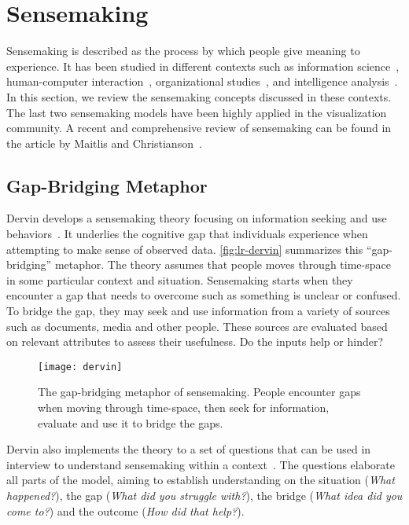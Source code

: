 \section{Sensemaking}
Sensemaking is described as the process by which people give meaning to experience. It has been studied in different contexts such as information science~\cite{Dervin1983}, human-computer interaction~\cite{Russell1993}, organizational studies~\cite{Weick1995}, and intelligence analysis~\cite{Pirolli2005,Klein2003}. In this section, we review the sensemaking concepts discussed in these contexts. The last two sensemaking models have been highly applied in the visualization community. A recent and comprehensive review of sensemaking can be found in the article by Maitlis and Christianson~\cite{Maitlis2014}.

\subsection{Gap-Bridging Metaphor}
Dervin develops a sensemaking theory focusing on information seeking and use behaviors~\cite{Dervin1983}. It underlies the cognitive gap that individuals experience when attempting to make sense of observed data. \autoref{fig:lr-dervin} summarizes this ``gap-bridging'' metaphor. The theory assumes that people moves through time-space in some particular context and situation. Sensemaking starts when they encounter a gap that needs to overcome such as something is unclear or confused. To bridge the gap, they may seek and use information from a variety of sources such as documents, media and other people. These sources are evaluated based on relevant attributes to assess their usefulness. Do the inputs help or hinder?

\begin{figure}[!htb]
	\centering
	\texttt{[image: dervin]}
	\caption{The gap-bridging metaphor of sensemaking. People encounter gaps when moving through time-space, then seek for information, evaluate and use it to bridge the gaps. }
	\label{fig:lr-dervin}
\end{figure}

Dervin also implements the theory to a set of questions that can be used in interview to understand sensemaking within a context~\cite{Dervin1983}. The questions elaborate all parts of the model, aiming to establish understanding on the situation (\emph{What happened?}), the gap (\emph{What did you struggle with?}), the bridge (\emph{What idea did you come to?}) and the outcome (\emph{How did that help?}).

